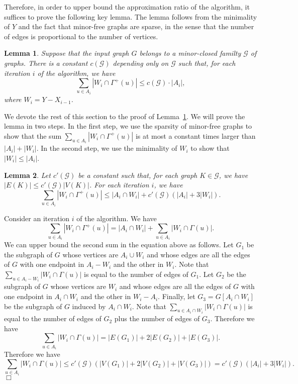 \documentclass[11pt]{article}
\newtheorem{lemma}{Lemma}[section]
\renewenvironment{proof}{\vspace{-0.1in}\noindent{\bf Proof:}}{\hspace*{\fill}$\Box$\par}
\def\script#1{\mathcal{#1}}
\def\card#1{\left|#1\right|}
\def\sG{\script{G}}
\begin{document}
\medskip\noindent
Therefore, in order to upper bound the approximation ratio of the
algorithm, it suffices to prove the following key lemma. The lemma
follows from the minimality of $Y$ and the fact that minor-free
graphs are sparse, in the sense that the number of edges is
proportional to the number of vertices.

\begin{lemma} \label{lem:counting}
	Suppose that the input graph $G$ belongs to a minor-closed
	familty $\sG$ of graphs. There is a constant $c({\sG})$ depending
	only on $\sG$ such that, for each iteration $i$ of the algorithm,
	we have
		$$\sum_{u \in A_i} \card{W_i \cap \Gamma^+(u)} \leq c({\sG})
		\cdotp \card{A_i},$$
	where $W_i = Y - X_{i - 1}$.
\end{lemma}

\noindent
We devote the rest of this section to the proof of
Lemma~\ref{lem:counting}. We will prove the lemma in two steps. In
the first step, we use the sparsity of minor-free graphs to show that
the sum $\sum_{u \in A_i} \card{W_i \cap \Gamma^+(u)}$ is
at most a constant times larger than $\card{A_i} + \card{W_i}$. In
the second step, we use the minimality of $W_i$ to show that
$\card{W_i} \leq \card{A_i}$.

\begin{lemma} \label{lem:counting-first}
	Let $c'(\sG)$ be a constant such that, for each graph $K \in
	\sG$, we have $\card{E(K)} \leq c'(\sG) \card{V(K)}$.  For each
	iteration $i$, we have
		$$\sum_{u \in A_i} \card{W_i \cap \Gamma^+(u)} \leq
		\card{A_i \cap W_i} + c'(\sG) (\card{A_i} + 3\card{W_i}).$$
\end{lemma}
\begin{proof}
	Consider an iteration $i$ of the algorithm.  We have
		$$\sum_{u \in A_i} \card{W_i \cap \Gamma^+(u)} = \card{A_i
		\cap W_i} + \sum_{u \in A_i} \card{W_i \cap \Gamma(u)}.$$
	We can upper bound the second sum in the equation above as
	follows.  Let $G_1$ be the subgraph of $G$ whose vertices are
	$A_i \cup W_i$ and whose edges are all the edges of $G$ with one
	endpoint in $A_i - W_i$ and the other in $W_i$. Note that
	$\sum_{u \in A_i - W_i} \card{W_i \cap \Gamma(u)}$ is equal to
	the number of edges of $G_1$.  Let $G_2$ be the subgraph of $G$
	whose vertices are $W_i$ and whose edges are all the edges of $G$
	with one endpoint in $A_i \cap W_i$ and the other in $W_i - A_i$.
	Finally, let $G_3 = G[A_i \cap W_i]$ be the subgraph of $G$
	induced by $A_i \cap W_i$. Note that $\sum_{u \in A_i \cap W_i}
	\card{W_i \cap \Gamma(u)}$ is equal to the number of edges of
	$G_2$ plus the number of edges of $G_3$. Therefore we have
		$$\sum_{u \in A_i} \card{W_i \cap \Gamma(u)} = \card{E(G_1)}
		+ 2\card{E(G_2)} + \card{E(G_3)}.$$
	Therefore we have
		$$\sum_{u \in A_i} \card{W_i \cap \Gamma(u)} \leq c'(\sG)
		(\card{V(G_1)} + 2\card{V(G_2)} + \card{V(G_3)}) = c'(\sG)
		(\card{A_i} + 3\card{W_i}).$$
\end{proof}
\end{document}
